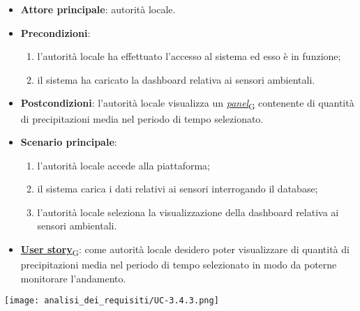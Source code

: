 \begin{itemize}
	\item \textbf{Attore principale}: autorità locale.
	\item \textbf{Precondizioni}:
	      \begin{enumerate}
		      \item l'autorità locale ha effettuato l'accesso al sistema ed esso è in funzione;
		      \item il sistema ha caricato la dashboard relativa ai sensori ambientali.
	      \end{enumerate}
	\item \textbf{Postcondizioni}: l'autorità locale visualizza un \href{https://7last.github.io/docs/pb/documentazione-interna/glossario\#panel}{\textit{panel}\textsubscript{G}} contenente di quantità di precipitazioni media nel periodo di tempo selezionato.
	\item \textbf{Scenario principale}:
	      \begin{enumerate}
		      \item l'autorità locale accede alla piattaforma;
		      \item il sistema carica i dati relativi ai sensori interrogando il database;
		      \item l'autorità locale seleziona la visualizzazione della dashboard relativa ai sensori ambientali.
	      \end{enumerate}
	\item \href{https://7last.github.io/docs/pb/documentazione-interna/glossario\#user-story}{\textbf{User story}\textsubscript{G}}: come autorità locale desidero poter visualizzare di quantità di precipitazioni media nel periodo di tempo selezionato
	      in modo da poterne monitorare l'andamento.
\end{itemize}
\begin{center}
	\texttt{[image: analisi\_dei\_requisiti/UC-3.4.3.png]}
\end{center}


